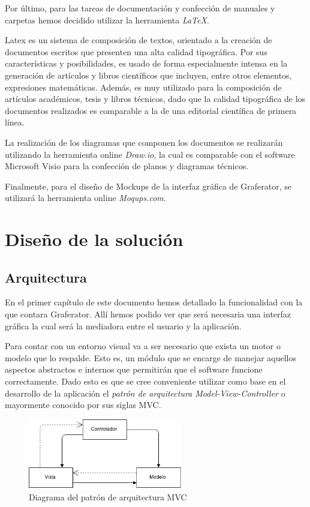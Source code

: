 \documentclass{book}
\begin{document}
Por último, para las tareas de documentación y confección de manuales y carpetas hemos decidido utilizar la herramienta \textit{LaTeX}. 
\par
Latex es un sistema de composición de textos, orientado a la creación de documentos escritos que presenten una alta calidad tipográfica. Por sus características y posibilidades, es usado de forma especialmente intensa en la generación de artículos y libros científicos que incluyen, entre otros elementos, expresiones matemáticas. Además, es muy utilizado para la composición de artículos académicos, tesis y libros técnicos, dado que la calidad tipográfica de los documentos realizados es comparable a la de una editorial científica de primera línea.
\par
La realización de los diagramas que componen los documentos se realizarán utilizando la herramienta online \textit{Draw.io}, la cual es comparable con el software Microsoft Visio para la confección de planos y diagramas técnicos.
\par
Finalmente, para el diseño de Mockups de la interfaz gráfica de Graferator, se utilizará la herramienta online \textit{Moqups.com}.



%
%
\chapter{Diseño de la solución}


\section{Arquitectura}

En el primer capítulo de este documento hemos detallado la funcionalidad con la que contara Graferator. Allí hemos podido ver que será necesaria una interfaz gráfica la cual será la mediadora entre el usuario y la aplicación. 
\par
Para contar con un entorno visual va a ser necesario que exista un motor o modelo que lo respalde. Esto es, un módulo que se encarge de manejar aquellos aspectos abstractos e internos que permitirán que el software funcione correctamente. Dado esto es que se cree conveniente utilizar como base en el desarrollo de la aplicación el \textit{patrón de arquitectura Model-View-Controller} o mayormente conocido por sus siglas MVC.
\bigskip

\begin{figure}[H]
	\centering
	\includegraphics[width=0.6\textwidth]{images/01-MVC.png}
	\medskip
	\caption{Diagrama del patrón de arquitectura MVC}
	\medskip
\end{figure}
	\bigskip
	
\end{document}
